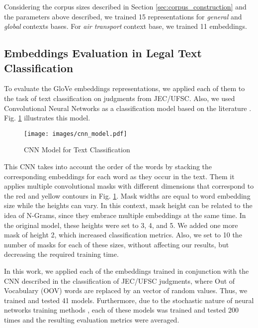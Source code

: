 Considering the corpus sizes described in Section \ref{sec:corpus_construction} and the parameters above described, we trained 15 representations for \emph{general} and \emph{global} contexts bases. For \textit{air transport} context base, we trained 11 embeddings.

\subsection{Embeddings Evaluation in Legal Text Classification}

To evaluate the GloVe embeddings representations, we applied each of them to the task of text classification on judgments from JEC/UFSC. Also, we used Convolutional Neural Networks as a classification model based on the literature \cite{Kim2014}. Fig. \ref{fig:cnn_model} illustrates this model.

\begin{figure}[htb]
    \centering
    \texttt{[image: images/cnn\_model.pdf]}
    \caption{CNN Model for Text Classification \cite{Kim2014}}
    \label{fig:cnn_model}
\end{figure}

This CNN takes into account the order of the words by stacking the corresponding embeddings for each word as they occur in the text. 
Them it applies multiple convolutional masks with different dimensions that correspond to the red and yellow contours in Fig. \ref{fig:cnn_model}. Mask widths are equal to word embedding size while the heights can vary. In this context, mask height can be related to the idea of N-Grams, since they embrace multiple embeddings at the same time. 
In the original model, these heights were set to 3, 4, and 5. We added one more mask of height 2, which increased classification metrics. Also, we set to 10 the number of masks for each of these sizes, without affecting our results, but decreasing the required training time. 

In this work, we applied each of the embeddings trained in conjunction with the CNN described in the classification of JEC/UFSC judgments, where Out of Vocabulary (OOV) words are replaced by an vector of random values. Thus, we trained and tested 41 models. Furthermore, due to the stochastic nature of neural networks training methods \cite{Cohen1995}, each of these models was trained and tested 200 times and the resulting evaluation metrics were averaged. 

